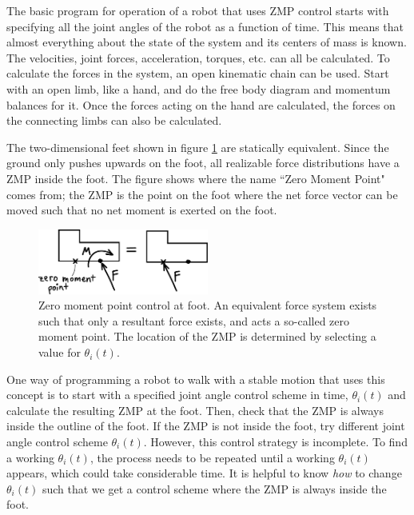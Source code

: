 The basic program for operation of a robot that uses ZMP control starts with specifying all the joint angles of the robot as a function of time. This means that almost everything about the state of the system and its centers of mass is known. The velocities, joint forces, acceleration, torques, etc. can all be calculated. To calculate the forces in the system, an open kinematic chain can be used. Start with an open limb, like a hand, and do the free body diagram and momentum balances for it. Once the forces acting on the hand are calculated, the forces on the connecting limbs can also be calculated. 


The two-dimensional feet shown in figure \ref{fig:ZMPFoot} are statically equivalent. Since the ground only pushes upwards on the foot, all realizable force distributions have a ZMP inside the foot. The figure shows where the name ``Zero Moment Point" comes from; the ZMP is the point on the foot where the net force vector can be moved such that no net moment is exerted on the foot. 

\begin{figure}[h]		%
\begin{centering}
\includegraphics[width=0.5\textwidth]{Figures/ZMPFoot}\par
\end{centering}
\caption[Diagram: Zero Moment Point at Foot]{Zero moment point control at foot. An equivalent force system exists such that only a resultant force exists, and acts a so-called zero moment point. The location of the ZMP is determined by selecting a value for $\theta_{i}(t)$.}
\label{fig:ZMPFoot}
\end{figure}
%

One way of programming a robot to walk with a stable motion that uses this concept is to start with a specified joint angle control scheme in time, $\theta_{i}(t)$ and calculate the resulting ZMP at the foot. Then, check that the ZMP is always inside the outline of the foot. If the ZMP is not inside the foot, try different joint angle control scheme $\theta_{i}(t)$. However, this control strategy is incomplete. To find a working $\theta_{i}(t)$, the process needs to be repeated until a working $\theta_{i}(t)$ appears, which could take considerable time. It is helpful to know \textit{how} to change $\theta_{i}(t)$ such that we get a control scheme where the ZMP is always inside the foot. 

